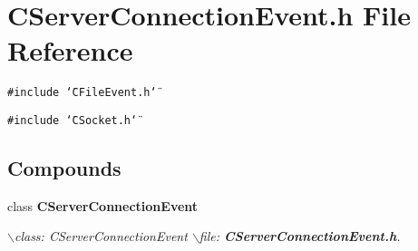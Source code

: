 \section{CServer\-Connection\-Event.h File Reference}
\label{CServerConnectionEvent_8h}
{\tt \#include \char`\"{}CFile\-Event.h\char`\"{}}\par
{\tt \#include \char`\"{}CSocket.h\char`\"{}}\par
\subsection*{Compounds}
\begin{CompactItemize}
\item 
class {\bf CServer\-Connection\-Event}
\begin{CompactList}\small\item\em $\backslash$class: CServer\-Connection\-Event $\backslash$file: {\bf CServer\-Connection\-Event.h}.\item\end{CompactList}\end{CompactItemize}

